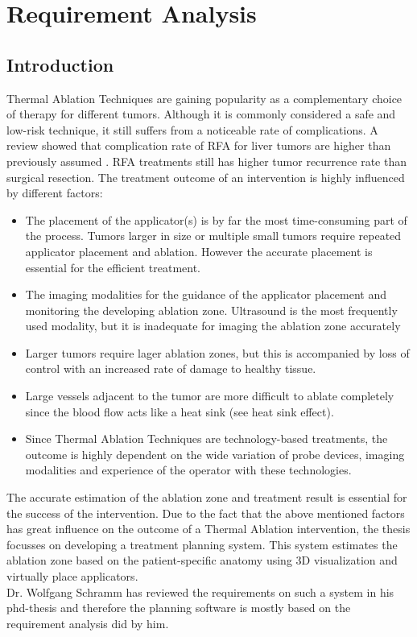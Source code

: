 \chapter{Requirement Analysis}
\section{Introduction}

Thermal Ablation Techniques are gaining popularity as a complementary choice of therapy for different tumors. Although it is commonly considered a safe and low-risk technique, it still suffers from a noticeable rate of complications. A review showed that complication rate of RFA for liver tumors are higher than previously assumed \cite{mulier-rfa}. RFA treatments still has higher tumor recurrence rate than surgical resection. The treatment outcome of an intervention is highly influenced by different factors:
\begin{itemize}
\item The placement of the applicator(s) is by far the most time-consuming part of the process. Tumors larger in size or multiple small tumors require repeated applicator placement and ablation.
However the accurate placement is essential for the efficient treatment. 
\item The imaging modalities for the guidance of the applicator placement and monitoring the developing ablation zone. Ultrasound is the most frequently used modality, but it is inadequate for imaging the ablation zone accurately \cite{diss-schramm} 
\item Larger tumors require lager ablation zones, but this is accompanied by loss of control with an increased rate of damage to healthy tissue. 
\item Large vessels adjacent to the tumor are more difficult to ablate completely since the blood flow acts like a heat sink (see heat sink effect).
\item Since Thermal Ablation Techniques are technology-based treatments, the outcome is highly dependent on the wide variation of probe devices, imaging modalities and experience of the operator with these technologies. 
\end{itemize}

The accurate estimation of the ablation zone and treatment result is essential for the success of the intervention. Due to the fact that the above mentioned factors has great influence on the outcome of a Thermal Ablation intervention, the thesis focusses on developing a treatment planning system. This system estimates the ablation zone based on the patient-specific anatomy using 3D visualization and virtually place applicators. \\

Dr. Wolfgang Schramm has reviewed the requirements on such a system in his phd-thesis and therefore the planning software is mostly based on the requirement analysis did by him. 
